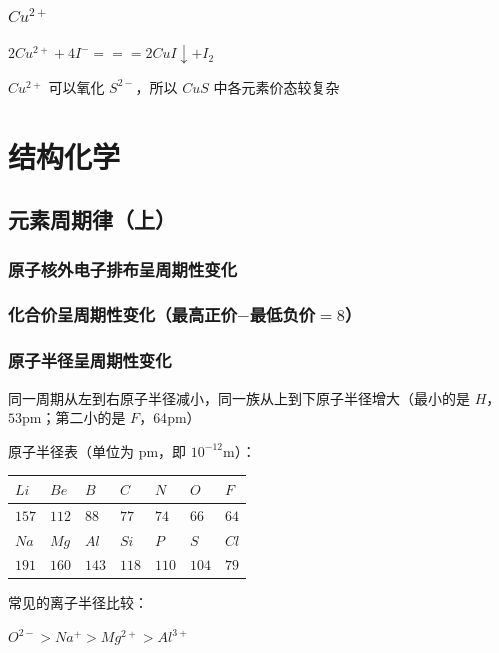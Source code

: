 \documentclass[UTF8,zihao=-4,openany]{ctexbook}
\begin{document}
\subsection{$Cu^{2+}$}
$2Cu^{2+}+4I^-=\!=\!=2CuI\downarrow+I_2$\par

$Cu^{2+}$ 可以氧化 $S^{2-}$，所以 $CuS$ 中各元素价态较复杂\par
\chapter{结构化学}
\section{元素周期律（上）}
\subsection{原子核外电子排布呈周期性变化}
\subsection{化合价呈周期性变化（最高正价$-$最低负价$=8$）}
\subsection{原子半径呈周期性变化}
同一周期从左到右原子半径减小，同一族从上到下原子半径增大（最小的是 $H$，$53$pm；第二小的是 $F$，$64$pm）\par

原子半径表（单位为 pm，即 $10^{-12}$m）：\par
\begin{table}[H]
\centering
\renewcommand{\arraystretch}{1.22}
\begin{tabularx}{\linewidth}{Y Y Y Y Y Y Y}
\toprule
$Li$ & $Be$ & $B$ & $C$ & $N$ & $O$ & $F$ \\
\midrule
$157$ & $112$ & $88$ & $77$ & $74$ & $66$ & $64$ \\
$Na$ & $Mg$ & $Al$ & $Si$ & $P$ & $S$ & $Cl$ \\
$191$ & $160$ & $143$ & $118$ & $110$ & $104$ & $79$ \\
\bottomrule
\end{tabularx}
\end{table}

常见的离子半径比较：\par

$O^{2-}>Na^+>Mg^{2+}>Al^{3+}$\par
\end{document}
